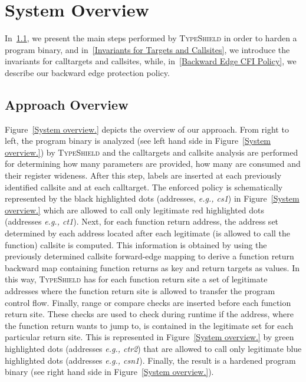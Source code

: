 \section{System Overview}
\label{chapter:TypeShild Overview}
In~\cref{Overview}, we present the main steps performed by \textsc{TypeShield} in order to harden a program binary, and
in~\cref{Invariants for Targets and Callsites}, we introduce the invariants for calltargets and callsites,
while, in~\cref{Backward Edge CFI Policy}, we describe our backward edge protection policy.
\subsection{Approach Overview}
\label{Overview}
Figure~\ref{System overview.} depicts the overview of our approach.
From right to left, the program binary is analyzed (see left hand side in Figure~\ref{System overview.}) by \textsc{TypeShield} and the calltargets
and callsite analysis are performed for determining 
how many parameters are provided, 
how many are consumed and their register wideness.
After this step, labels are inserted at each previously identified callsite and at each calltarget. 
The enforced policy is schematically represented by the black highlighted dots (addresses, \textit{e.g., cs1}) in Figure~\ref{System overview.} 
which are allowed to call only legitimate red highlighted dots (addresses \textit{e.g., ct1}).
Next, for each function return address, the address set determined by each address located after each legitimate (is allowed to call the function) callsite is computed.
This information is obtained by using the previously determined callsite forward-edge mapping to derive a function return backward map containing function returns as key and return targets as values.
In this way, \textsc{TypeShield} has for each function return site a set of legitimate addresses where the function return site is allowed to transfer the program control flow.
Finally, range or compare checks are inserted before each function return site. These checks are used to check during runtime if the 
address, where the function return wants to jump to, is contained in the legitimate set for each particular return site.
This is represented in Figure~\ref{System overview.} by green highlighted dots (addresses \textit{e.g., ctr2}) that are allowed to call only legitimate blue 
highlighted dots (addresses \textit{e.g., csn1}).
Finally, the result is a hardened program binary (see right hand side in Figure~\ref{System overview.}).

